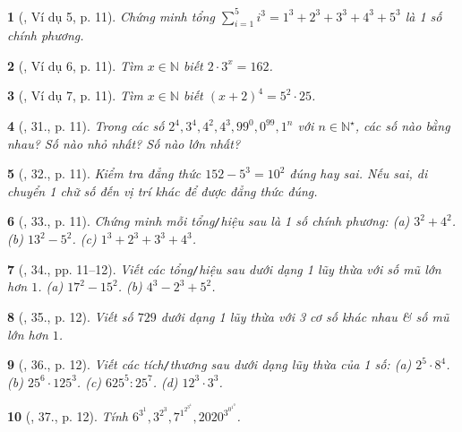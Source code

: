 \documentclass{article}
\newtheorem{baitoan}{}
\begin{document}
\begin{baitoan}[\cite{Tuyen_Toan_6}, Ví dụ 5, p. 11]
	Chứng minh tổng $\sum_{i=1}^5 i^3 = 1^3 + 2^3 + 3^3 + 4^3 + 5^3$ là 1 số chính phương.
\end{baitoan}

\begin{baitoan}[\cite{Tuyen_Toan_6}, Ví dụ 6, p. 11]
	Tìm $x\in\mathbb{N}$ biết $2\cdot3^x = 162$.
\end{baitoan}

\begin{baitoan}[\cite{Tuyen_Toan_6}, Ví dụ 7, p. 11]
	Tìm $x\in\mathbb{N}$ biết $(x + 2)^4 = 5^2\cdot25$.
\end{baitoan}

\begin{baitoan}[\cite{Tuyen_Toan_6}, 31., p. 11]
	Trong các số $2^4,3^4,4^2,4^3,99^0,0^{99},1^n$ với $n\in\mathbb{N}^\star$, các số nào bằng nhau? Số nào nhỏ nhất? Số nào lớn nhất?
\end{baitoan}

\begin{baitoan}[\cite{Tuyen_Toan_6}, 32., p. 11]
	Kiểm tra đẳng thức $152 - 5^3 = 10^2$ đúng hay sai. Nếu sai, di chuyển 1 chữ số đến vị trí khác để được đẳng thức đúng.
\end{baitoan}

\begin{baitoan}[\cite{Tuyen_Toan_6}, 33., p. 11]
	Chứng minh mỗi tổng{\tt/}hiệu sau là 1 số chính phương: (a) $3^2 + 4^2$. (b) $13^2 - 5^2$. (c) $1^3 + 2^3 + 3^3 + 4^3$.
\end{baitoan}

\begin{baitoan}[\cite{Tuyen_Toan_6}, 34., pp. 11--12]
	Viết các tổng{\tt/}hiệu sau dưới dạng 1 lũy thừa với số mũ lớn hơn $1$. (a) $17^2 - 15^2$. (b) $4^3 - 2^3 + 5^2$. 
\end{baitoan}

\begin{baitoan}[\cite{Tuyen_Toan_6}, 35., p. 12]
	Viết số $729$ dưới dạng 1 lũy thừa với 3 cơ số khác nhau \& số mũ lớn hơn $1$.
\end{baitoan}

\begin{baitoan}[\cite{Tuyen_Toan_6}, 36., p. 12]
	Viết các tích{\tt/}thương sau dưới dạng lũy thừa của 1 số: (a) $2^5\cdot8^4$. (b) $25^6\cdot125^3$. (c) $625^5:25^7$. (d) $12^3\cdot3^3$.
\end{baitoan}

\begin{baitoan}[\cite{Tuyen_Toan_6}, 37., p. 12]
	Tính $6^{3^1},3^{2^3},7^{1^{2^{3^4}}},2020^{3^{0^{1^0}}}$.
\end{baitoan}
\end{document}
